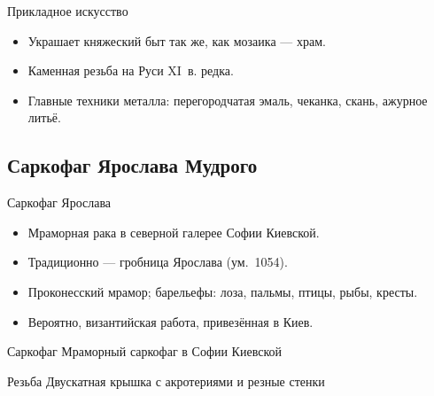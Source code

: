 \begin{frame}{Прикладное искусство}
  \begin{itemize}
    \item Украшает княжеский быт так же, как мозаика --- храм.
    \item Каменная резьба на Руси XI~в. редка.
    \item Главные техники металла: перегородчатая эмаль,
          чеканка, скань, ажурное литьё.
  \end{itemize}
\end{frame}

\subsection{Саркофаг Ярослава Мудрого}

\begin{frame}{Саркофаг Ярослава}
  \begin{itemize}
    \item Мраморная рака в северной галерее Софии Киевской.
    \item Традиционно --- гробница Ярослава (ум.\ 1054).
    \item Проконесский мрамор; барельефы: лоза, пальмы,
          птицы, рыбы, кресты.
    \item Вероятно, византийская работа, привезённая в Киев.
  \end{itemize}
\end{frame}

\begin{frame}{Саркофаг}
    {Мраморный саркофаг в Софии Киевской}
\end{frame}

\begin{frame}{Резьба}
    {Двускатная крышка с акротериями и резные стенки}
\end{frame}

